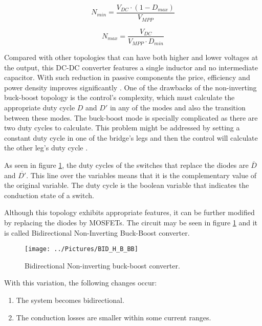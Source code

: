 \begin{equation} \label{boost_number_of_panels}
 N_{min} = \frac{V_{DC} \cdot (1 - D_{max})}{V_{MPP}}
\end{equation}

\begin{equation} \label{buck_number_of_panels}
 N_{max} = \frac{V_{DC}}{V_{MPP} \cdot D_{min}}
\end{equation}

Compared with other topologies that can have both higher and lower voltages at the output, this DC-DC converter features a single inductor and no intermediate capacitor. With such reduction in passive components the price, efficiency and power density improves significantly \cite{underthehood}. One of the drawbacks of the non-inverting buck-boost topology is the control's complexity, which must calculate the appropriate duty cycle $D$ and $D'$ in any of the modes and also the transition between these modes. The buck-boost mode is specially complicated as there are two duty cycles to calculate. This problem might be addressed by setting a constant duty cycle in one of the bridge's legs and then the control will calculate the other leg's duty cycle  \cite{AN4449_ST}.

As seen in figure \ref{BID_N_INV_BB_SCHEMATIC}, the duty cycles of the switches that replace the diodes are $\overline{D}$ and $\overline{D'}$. This line over the variables means that it is the complementary value of the original variable. The duty cycle is the boolean variable that indicates the conduction state of a switch. 
		
Although this topology exhibits appropriate features, it can be further modified by replacing the diodes by MOSFETs. The circuit may be seen in figure \ref{BID_N_INV_BB_SCHEMATIC} and it is called Bidirectional Non-Inverting Buck-Boost converter.

\begin{figure}[H]
	\begin{center}
		\texttt{[image: ../Pictures/BID\_H\_B\_BB]}
		\caption{Bidirectional Non-inverting buck-boost converter.}
		\label{BID_N_INV_BB_SCHEMATIC}
	\end{center}
\end{figure}

\noindent With this variation, the following changes occur:
		
\begin{enumerate}
	\item The system becomes bidirectional.
	\item The conduction losses are smaller within some current ranges. 
\end{enumerate}

